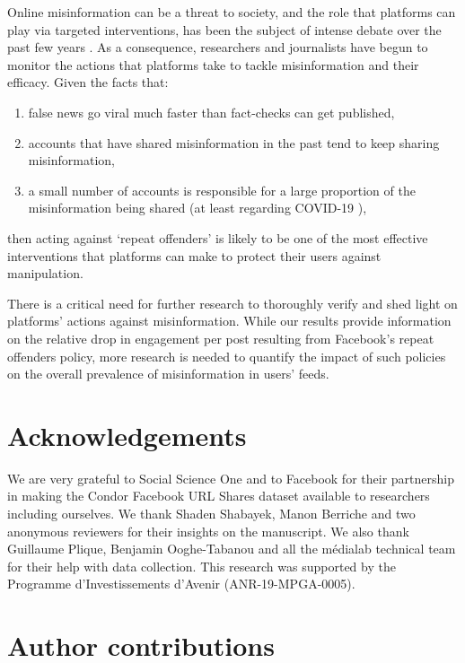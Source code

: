 \documentclass[review]{elsarticle}
\begin{document}
{{Online misinformation can be a threat to society, and the role that platforms can play via targeted interventions, has been the subject of intense debate over the past few years \citep{rogers2020deplatforming}. 
As a consequence, researchers \citep{mena2020cleaning, yaqub2020effects} and journalists \citep{FacebookPartisanBias, FacebookCivilityGrowth} have begun to monitor the actions that platforms take to tackle misinformation and their efficacy.
Given the facts that:
\begin{enumerate}[(1)]
\item false news go viral much faster than fact-checks can get published,
\item accounts that have shared misinformation in the past tend to keep sharing misinformation,
\item a small number of accounts is responsible for a large proportion of the misinformation being shared (at least regarding COVID-19 \citep{disinformationDozen}),
\end{enumerate}
then acting against `repeat offenders' is likely to be one of the most effective interventions that platforms can make to protect their users against manipulation.

There is a critical need for further research to thoroughly verify and shed light on platforms' actions against misinformation. 
While our results provide information on the relative drop in engagement per post resulting from Facebook’s repeat offenders policy, more research is needed to quantify the impact of such policies on the overall prevalence of misinformation in users’ feeds.

\section*{Acknowledgements}

We are very grateful to Social Science One and to Facebook for their partnership in making the Condor Facebook URL Shares dataset available to researchers including ourselves.
We thank Shaden Shabayek, Manon Berriche and two anonymous reviewers for their insights on the manuscript.
We also thank Guillaume Plique, Benjamin Ooghe-Tabanou and all the médialab technical team for their help with data collection.
This research was supported by the Programme d’Investissements d’Avenir (ANR-19-MPGA-0005).

\section*{Author contributions}

}}
\end{document}
